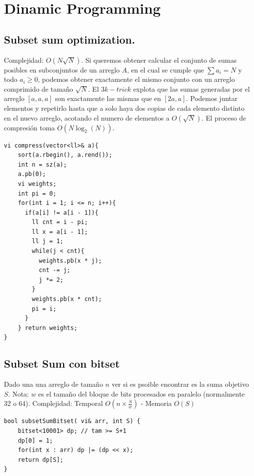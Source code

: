 \section{Dinamic Programming}



\subsection{Subset sum optimization.}
Complejidad: $O(N\sqrt{N})$. Si queremos obtener calcular el conjunto de sumas posibles en subconjuntos de un arreglo $A$, en el cual se cumple que $\sum a_i = N$ y todo $a_i\geq0$, podemos obtener exactamente el mismo conjunto con un arreglo comprimido de tamaño $\sqrt{N}$. El $3k-trick$ explota que las sumas generadas por el arreglo $[a,a,a]$ son exactamente las mismas que en $[2a,a]$. Podemos juntar elementos y repetirlo hasta que a solo haya dos copias de cada elemento distinto en el nuevo arreglo, acotando el numero de elementos a $O(\sqrt{N})$. El proceso de compresión toma $O(N\log_2(N))$.
\begin{verbatim}
vi compress(vector<ll>& a){
    sort(a.rbegin(), a.rend());
    int n = sz(a);
    a.pb(0);
    vi weights;
    int pi = 0;
    for(int i = 1; i <= n; i++){
      if(a[i] != a[i - 1]){
        ll cnt = i - pi;
        ll x = a[i - 1];
        ll j = 1;
        while(j < cnt){
          weights.pb(x * j);
          cnt -= j;
          j *= 2;
        }
        weights.pb(x * cnt);
        pi = i;
      }
    } return weights;
}
\end{verbatim}


\subsection{Subset Sum con bitset}
Dado una una arreglo de tamaño \(n\) ver si es psoible encontrar es la suma objetivo  \(S\). Nota: \(w\) es el tamaño del bloque de bits procesados en paralelo (normalmente 32 o 64). Complejidad:  Temporal \(O\left(n \times \frac{S}{w}\right)\) -  Memoria \(O(S)\)

\begin{verbatim}
bool subsetSumBitset( vi& arr, int S) {
    bitset<10001> dp; // tam >= S+1
    dp[0] = 1;
    for(int x : arr) dp |= (dp << x);
    return dp[S];
}
\end{verbatim}




